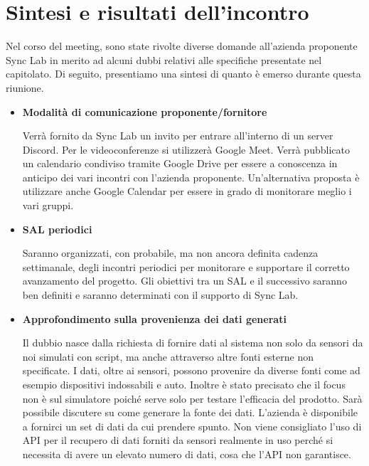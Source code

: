 \documentclass{article}
\begin{document}
\section*{\textbf{Sintesi e risultati dell’incontro}}

Nel corso del meeting, sono state rivolte diverse domande all'azienda proponente Sync Lab in merito ad alcuni dubbi relativi alle specifiche presentate nel capitolato.
Di seguito, presentiamo una sintesi di quanto è emerso durante questa riunione.

\begin{itemize}
\item \textbf{\fontsize{12}{6}\selectfont Modalità di comunicazione proponente/fornitore}

Verrà fornito
da Sync Lab un invito per entrare all’interno di un server Discord.
Per le videoconferenze si utilizzerà Google Meet.
Verrà pubblicato un calendario condiviso tramite Google Drive per essere a conoscenza in anticipo dei vari incontri con l’azienda proponente. Un’alternativa proposta è utilizzare anche Google Calendar per essere in grado di monitorare meglio i vari gruppi.
\vspace{0.5cm} 

\item \textbf{\fontsize{12}{6}\selectfont SAL periodici}

Saranno organizzati, con probabile, ma non ancora definita cadenza settimanale, degli incontri periodici per monitorare e supportare il corretto avanzamento del progetto.
Gli obiettivi tra un SAL e il successivo saranno ben definiti e saranno determinati con il supporto di Sync Lab.
\vspace{0.5cm} 

\item \textbf{\fontsize{12}{6}\selectfont Approfondimento sulla provenienza dei dati generati}

Il dubbio nasce dalla richiesta di fornire dati al sistema non solo da sensori da noi simulati con script, ma anche attraverso altre fonti esterne non specificate.
I dati, oltre ai sensori, possono provenire da diverse fonti come ad esempio dispositivi indossabili e auto.
Inoltre è stato precisato che il focus non è sul simulatore poiché serve solo per testare l’efficacia del prodotto.
Sarà possibile discutere su come generare la fonte dei dati. L’azienda è disponibile a fornirci un set di dati da cui prendere spunto.
Non viene consigliato l’uso di API per il recupero di dati forniti da sensori realmente in uso perché si necessita di avere un elevato numero di dati, cosa che l’API non garantisce.
\vspace{0.5cm} 


\end{itemize}
\end{document}
